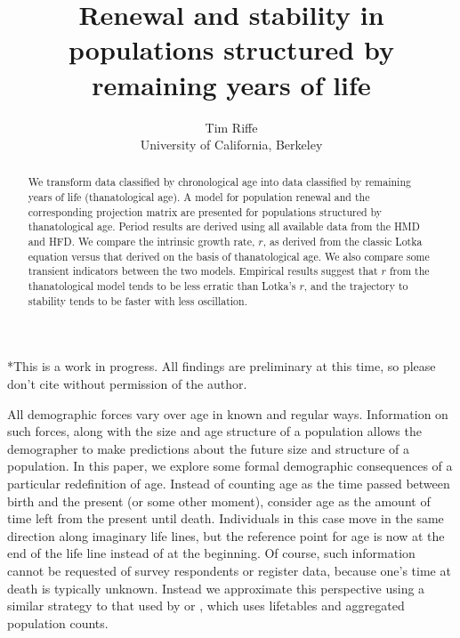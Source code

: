 \documentclass{article}
\begin{document}
\title{Renewal and stability in populations structured by remaining
years of life}
\author{Tim Riffe \\ University of California, Berkeley}
\maketitle

\begin{abstract}
We transform data classified by chronological age into data classified by
remaining years of life (thanatological age). A model for population renewal and
the corresponding projection matrix are presented for populations structured by
thanatological age. Period results are derived using all available data from the
HMD and HFD. We compare the intrinsic growth rate, $r$, as derived from the
classic Lotka equation versus that derived on the basis of thanatological age.
We also compare some transient indicators between the two
models. Empirical results suggest that $r$ from the thanatological model tends to be less erratic than
Lotka's $r$, and the trajectory to stability tends to be faster with less
oscillation.
\end{abstract}

*This is a work in progress. All findings are preliminary at this time, so
please don't cite without permission of the author.
\vspace{2em}

All demographic forces vary over age in known and regular ways. Information on
such forces, along with the size and age structure of a population allows the
demographer to make predictions about the future size and structure of a population. In this
paper, we explore some formal demographic consequences of a particular
redefinition of age. Instead of counting age as the time passed between birth and the present (or
some other moment), consider age as the amount of time left from the present
until death. Individuals in this case move in the same direction along
imaginary life lines, but the reference point for age is now at the end of the
life line instead of at the beginning. Of course, such information cannot be
requested of survey respondents or register data, because one's time at death is
typically unknown. Instead we approximate this perspective using a similar
strategy to that used by \citet{miller2001increasing} or
\citet{lee2002approach}, which uses lifetables and aggregated
population counts.
\end{document}
